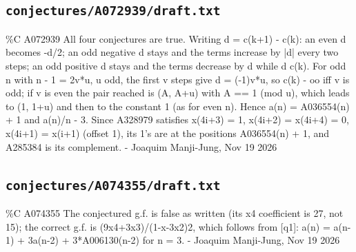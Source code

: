 \subsection*{\texttt{conjectures/A072939/draft.txt}}
{\small\raggedright\ttfamily
\%C A072939 All four conjectures are true. Writing d = c(k+1) - c(k): an even d becomes -d/2; an odd negative d stays and the terms increase by |d| every two steps; an odd positive d stays and the terms decrease by d while d  c(k). For odd n with n - 1 = 2v*u, u odd, the first v steps give d = (-1)v*u, so c(k) - oo iff v is odd; if v is even the pair reached is (A, A+u) with A == 1 (mod u), which leads to (1, 1+u) and then to the constant 1 (as for even n). Hence a(n) = A036554(n) + 1 and a(n)/n - 3. Since A328979 satisfies x(4i+3) = 1, x(4i+2) = x(4i+4) = 0, x(4i+1) = x(i+1) (offset 1), its 1's are at the positions A036554(n) + 1, and A285384 is its complement. - Joaquim Manji-Jung, Nov 19 2026\par
}
\subsection*{\texttt{conjectures/A074355/draft.txt}}
{\small\raggedright\ttfamily
\%C A074355 The conjectured g.f. is false as written (its x4 coefficient is 27, not 15); the correct g.f. is (9x4+3x3)/(1-x-3x2)2, which follows from [q1]: a(n) = a(n-1) + 3a(n-2) + 3*A006130(n-2) for n = 3. - Joaquim Manji-Jung, Nov 19 2026\par
}
